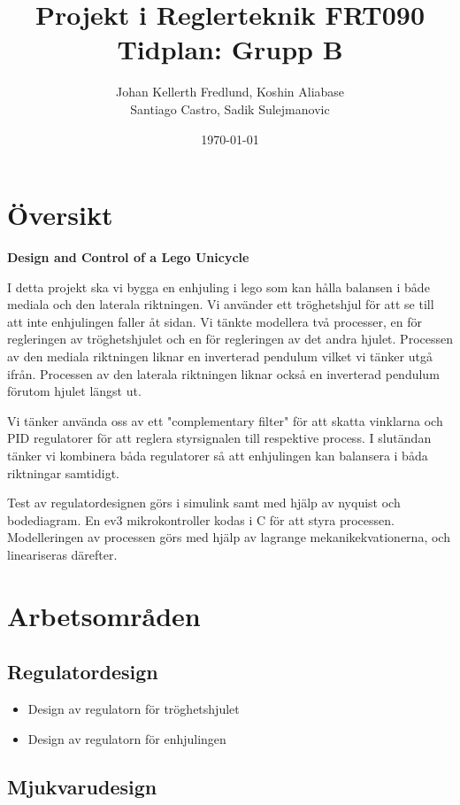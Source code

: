 \documentclass[a4paper]{article}
\title{Projekt i Reglerteknik FRT090\\ Tidplan: Grupp B}
\author{Johan Kellerth Fredlund, Koshin Aliabase\\ Santiago Castro, Sadik Sulejmanovic}
\date{\today}
\begin{document}
\maketitle



\section{Översikt}

\textbf{Design and Control of a Lego Unicycle}

I detta projekt ska vi bygga en enhjuling i lego som kan hålla balansen i både mediala och den laterala riktningen. Vi använder ett tröghetshjul för att se till att inte enhjulingen faller åt sidan. Vi tänkte modellera två processer, en för regleringen av tröghetshjulet och en för regleringen av det andra hjulet. Processen av den mediala riktningen liknar en inverterad pendulum vilket vi tänker utgå ifrån. Processen av den laterala riktningen liknar också en inverterad pendulum förutom hjulet längst ut.

Vi tänker använda oss av ett "complementary filter" för att skatta vinklarna och PID regulatorer för att reglera styrsignalen till respektive process. I slutändan tänker vi kombinera båda regulatorer så att enhjulingen kan balansera i båda riktningar samtidigt.

Test av regulatordesignen görs i simulink samt med hjälp av nyquist och bodediagram. En ev3 mikrokontroller kodas i C för att styra processen. Modelleringen av processen görs med hjälp av lagrange mekanikekvationerna, och lineariseras därefter.


\section{Arbetsområden}

    \subsection*{Regulatordesign}
    
    \begin{itemize}
    \item [] Design av regulatorn för tröghetshjulet
    \item [] Design av regulatorn för enhjulingen
    \end{itemize}
    
    \subsection*{Mjukvarudesign}
    
\end{document}
